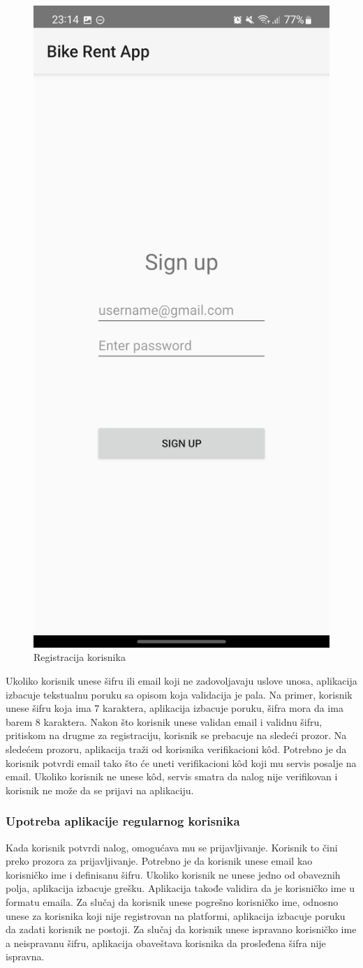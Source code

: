 \documentclass[12pt,oneside]{memoir}
\begin{document}
\begin{figure}[!ht]
  \centering
  \includegraphics[height=0.6\textwidth]{Registracija.jpg}
  \caption{Registracija korisnika}
  \label{fig:registracijaKorisnika}
\end{figure}

 
Ukoliko korisnik unese šifru ili email koji ne zadovoljavaju uslove unosa, aplikacija izbacuje tekstualnu poruku sa opisom koja validacija je pala. Na primer, korisnik unese šifru koja ima 7 karaktera, aplikacija izbacuje poruku, šifra mora da ima barem 8 karaktera. Nakon što korisnik unese validan email i validnu šifru, pritiskom na drugme za registraciju, korisnik se prebacuje na sledeći prozor. Na sledećem prozoru, aplikacija traži od korisnika verifikacioni kôd. Potrebno je da korisnik potvrdi email tako što će uneti verifikacioni kôd koji mu servis posalje na email. Ukoliko korisnik ne unese kôd, servis smatra da nalog nije verifikovan i korisnik ne može da se prijavi na aplikaciju.
 
\subsubsection{Upotreba aplikacije regularnog korisnika}
 
Kada korisnik potvrdi nalog, omogućava mu se prijavljivanje. Korisnik to čini preko prozora za prijavljivanje. Potrebno je da korisnik unese email kao korisničko ime i definisanu šifru. Ukoliko korisnik ne unese jedno od obaveznih polja, aplikacija izbacuje grešku. Aplikacija takođe validira da je korisničko ime u formatu emaila. Za slučaj da korisnik unese pogrešno korisničko ime, odnosno unese za korisnika koji nije registrovan na platformi, aplikacija izbacuje poruku da zadati korisnik ne postoji. Za slučaj da korisnik unese ispravano korisničko ime a neispravanu šifru, aplikacija obaveštava korisnika da prosleđena šifra nije ispravna.
 
\end{document}
